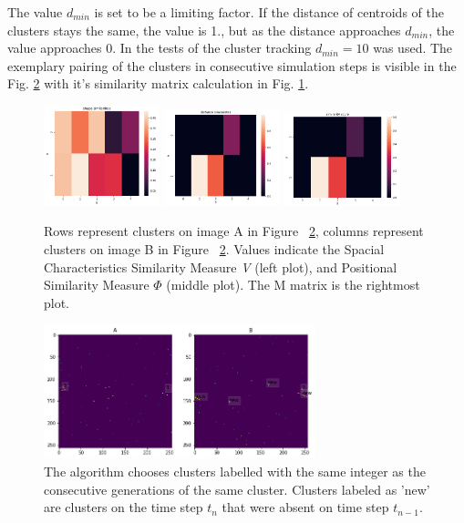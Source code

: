 The value $d_{min}$ is set to be a limiting factor. If the distance of centroids of the clusters stays the same, the value is 1., but as the distance approaches $d_{min}$, the value approaches 0.
In the tests of the cluster tracking $d_{min}=10$ was used.
The exemplary pairing of the clusters in consecutive simulation steps is visible in the Fig. \ref{fig:fin_clus} with it's similarity matrix calculation in Fig. \ref{fig:sims}.

\begin{figure}[h]
\centering
\includegraphics[width=0.3\textwidth]{figures/chapter4/velopix_clusters/shape.png}
\includegraphics[width=0.3\textwidth]{figures/chapter4/velopix_clusters/distance.png}
\includegraphics[width=0.3\textwidth]{figures/chapter4/velopix_clusters/similarity.png}
\caption{Rows represent clusters on image A in Figure ~\ref{fig:fin_clus}, columns represent clusters on image B in Figure ~\ref{fig:fin_clus}. Values indicate the Spacial Characteristics Similarity Measure \textit{V} (left plot), and Positional Similarity Measure \textit{$\Phi$} (middle plot). The M matrix is the rightmost plot.
}
\label{fig:sims}
\end{figure}

\begin{figure}[H]
\centering
\includegraphics[width=0.7\textwidth]{figures/chapter4/velopix_clusters/paired.png}
\caption{The algorithm chooses clusters labelled with the same integer as the consecutive generations of the same cluster. Clusters labeled as 'new' are clusters on the time step $t_{n}$ that were absent on time step $t_{n-1}$.}
\label{fig:fin_clus}
\end{figure}

